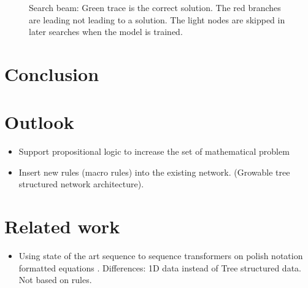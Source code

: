 \documentclass{scrartcl}
\begin{document}
\begin{figure}[!htbp]
	\centering
	
	\caption{Search beam: Green trace is the correct solution. The red branches are leading not leading to a solution. The light nodes are skipped in later searches when the model is trained.} \label{fig:M1}
\end{figure}

\section{Conclusion}

\section{Outlook}
\begin{itemize}
	\item Support propositional logic to increase the set of mathematical problem
	\item Insert new rules (macro rules) into the existing network. (Growable tree structured network architecture). \cite{graves2016hybrid}
\end{itemize}

\section{Related work}

\begin{itemize}
	\item Using state of the art sequence to sequence transformers on polish notation formatted equations \cite{Lample2020Deep}. Differences: 1D data instead of Tree structured data. Not based on rules. 
\end{itemize}

\printbibliography
\end{document}

